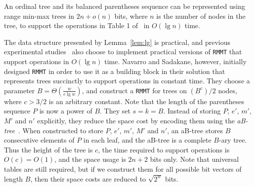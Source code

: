 \begin{lemma}\label{lem:lg}
An ordinal tree and its balanced parentheses sequence can be represented using range min-max trees in $2n + o(n)$ bits, where $n$ is the number of nodes in the tree, to support the operations in Table 1 of~\cite{Navarro:2014:FFS:2620785.2601073} in $O(\lg n)$ time. 
\end{lemma}

The data structure presented by Lemma~\ref{lem:lg} is practical, and previous experimental studies~\cite{ACNSalenex10} also choose to implement practical versions of {\tt RMMT} that support operations in $O(\lg n)$ time. 
Navarro and Sadakane, however, initially designed {\tt RMMT} in order to use it as a building block in their solution that represents trees succinctly to support operations in constant time. 
They choose a parameter $B = \Theta(\frac{w}{c\lg w})$, and construct a {\tt RMMT} for trees on $(B^c)/2$ nodes, where $c > 3/2$ is an arbitrary constant. 
Note that the length of the parentheses sequence $P$ is now a power of $B$. 
They set $s = k = B$. 
Instead of storing $P$, $e'$, $m'$, $M'$ and $n'$ explicitly, they reduce the space cost by encoding them using the {\em aB-tree}~\cite{Patrascu:2008:SUC:1470582.1470670}. 
When constructed to store $P$, $e'$, $m'$, $M'$ and $n'$, an aB-tree stores $B$ consecutive elements of $P$ in each leaf, and the aB-tree is a complete $B$-ary tree. 
Thus the height of the tree is $c$, the time required to support operations is $O(c) = O(1)$, and the space usage is $2n+2$ bits only. 
Note that universal tables are still required, but if we construct them for all possible bit vectors of length $B$, then their space costs are reduced to $\sqrt{2^w}$ bits. 

%
%
%
%
%
